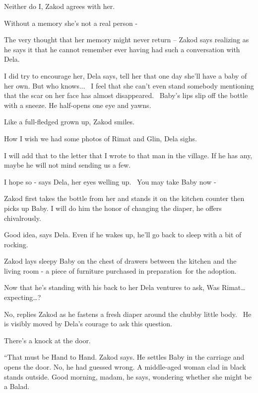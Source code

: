 \documentclass[12pt]{book}
\begin{document}
{\textquotedbl}Neither do I,{\textquotedbl} Zakod agrees with her.

{\textquotedbl}Without a memory she's not a real person -{\textquotedbl}

{\textquotedbl}The very thought that her memory might never return -- {\textquotedbl} Zakod says realizing as he says it
that he cannot remember ever having had such a conversation with Dela.

{\textquotedbl}I did try to encourage her,{\textquotedbl} Dela says, {\textquotedbl}tell her that one day she'll have a
baby of her own. But who knows...~ I feel that she can't even stand somebody mentioning that the scar on her face has
almost disappeared.{\textquotedbl} \ Baby's lips slip off the bottle with a sneeze. He half-opens one eye and yawns.

{\textquotedbl}Like a full-fledged grown up,{\textquotedbl} Zakod smiles.

{\textquotedbl}How I wish we had some photos of Rimat and Glin,{\textquotedbl} Dela sighs.

{\textquotedbl}I will add that to the letter that I wrote to that man in the village. If he has any, maybe he will not
mind sending us a few.{\textquotedbl}

{\textquotedbl}I hope so -{\textquotedbl} says Dela, her eyes welling up. ~{\textquotedbl}You may take Baby now
-{\textquotedbl}

Zakod first takes the bottle from her and stands it on the kitchen counter then picks up Baby. {\textquotedbl}I will do
him the honor of changing the diaper,{\textquotedbl} he offers chivalrously.~

{\textquotedbl}Good idea,{\textquotedbl} says Dela. {\textquotedbl}Even if he wakes up, he'll go back to sleep with a
bit of rocking.{\textquotedbl}

Zakod lays sleepy Baby on the chest of drawers between the kitchen and the living room - a piece of furniture purchased
in preparation~for the adoption.

Now that he's standing with his back to her Dela ventures to ask, {\textquotedbl}Was Rimat{\dots}
expecting{\dots}?{\textquotedbl}

{\textquotedbl}No,{\textquotedbl} replies Zakod as he fastens a fresh diaper around the chubby little body.~ He is
visibly moved by Dela's courage to ask this question.

There's a knock at the door.

{}``That must be Hand to Hand.{\textquotedbl} Zakod says. He settles Baby in the carriage and opens the door. No, he had
guessed wrong. A middle-aged{ }woman clad in black stands outside. {\textquotedbl}Good morning,
madam,{\textquotedbl} he says, wondering whether she might be a Balad.
\end{document}
